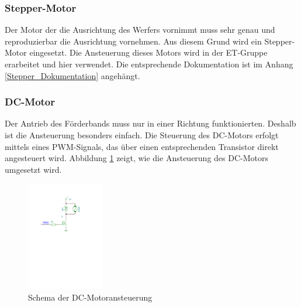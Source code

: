 \subsubsection{Stepper-Motor}
    Der Motor der die Ausrichtung des Werfers vornimmt muss sehr genau und 
    reproduzierbar die Ausrichtung vornehmen. Aus diesem Grund wird ein 
    Stepper-Motor eingesetzt. Die Ansteuerung dieses Motors wird in der 
    ET-Gruppe erarbeitet und hier verwendet. Die entsprechende Dokumentation 
    ist im Anhang \ref{Stepper_Dokumentation} angehängt.
\subsubsection{DC-Motor}
    Der Antrieb des Förderbands muss nur in einer Richtung funktionierten. 
    Deshalb ist die Ansteuerung besonders einfach. Die Steuerung des DC-Motors 
    erfolgt mittels eines PWM-Signals, das über einen entsprechenden 
    Transistor direkt angesteuert wird. Abbildung \ref{fig:Schema_DC-Motor} 
    zeigt, wie die Ansteuerung des DC-Motors umgesetzt wird.
    \begin{figure}[h!] %
    	\centering
    	\includegraphics[width=0.3\textwidth,clip,trim=37mm 159mm 62mm 37mm]
    	{Enddokumentation/Loesungskonzept/Bilder/SchemaDcMotor.pdf}
    	\caption{Schema der DC-Motoransteuerung}
    	\label{fig:Schema_DC-Motor}
    \end{figure}